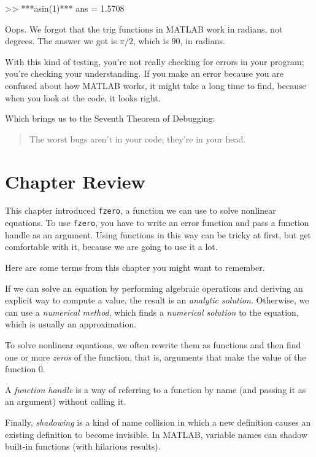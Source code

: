 \begin{code}
>> ***asin(1)***
ans = 1.5708
\end{code}

Oops.  We forgot that the trig functions in MATLAB work in radians,
not degrees.  The answer we got is $\pi/2$, which is $90$\textdegree, in radians.

With this kind of testing, you're not really checking for
errors in your program; you're checking your understanding.  If you
make an error because you are confused about how MATLAB works, it
might take a long time to find, because when you look at the code,
it looks right.


Which brings us to the Seventh Theorem of Debugging:

\begin{quote}
The worst bugs aren't in your code; they're in your head.
\end{quote}

\section{Chapter Review}

This chapter introduced \lstinline{fzero}, a function we can use to solve nonlinear equations.
To use \lstinline{fzero}, you have to write an error function and pass a function handle as an argument.  Using functions in this way can be tricky at first, but get comfortable with it, because we are going to use it a lot.

Here are some terms from this chapter you might want to remember.

If we can solve an equation by performing algebraic operations and deriving an explicit way to compute a value, the result is an \emph{analytic solution}.
Otherwise, we can use a \emph{numerical method}, which finds a \emph{numerical solution} to the equation, which is usually an approximation.

To solve nonlinear equations, we often rewrite them as functions and then find one or more \emph{zeros} of the function, that is, arguments that make the value of the function $0$.

A \emph{function handle} is a way of
referring to a function by name (and passing it as an argument)
without calling it.

Finally, \emph{shadowing} is a kind of name collision in which a new definition
causes an existing definition to become invisible.  In MATLAB,
variable names can shadow built-in functions (with hilarious results).

